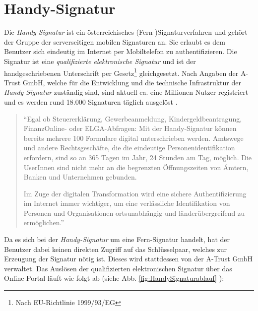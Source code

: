 \documentclass[11pt,a4paper,ngerman]{report}
\begin{document}
\section{Handy-Signatur}\label{sec:HandySignatur}
Die \textit{Handy-Signatur} ist ein österreichisches (Fern-)Signaturverfahren und gehört der Gruppe der serverseitigen mobilen Signaturen an. Sie erlaubt es dem Benutzer sich eindeutig im Internet per Mobiltelefon zu authentifizieren. Die Signatur ist eine \textit{qualifizierte elektronische Signatur} und ist der handgeschriebenen Unterschrift per Gesetz\footnote{Nach EU-Richtlinie 1999/93/EG\cite{eSigEU99}} gleichgesetzt. Nach Angaben der A-Trust GmbH, welche für die Entwicklung und die technische Infrastruktur der \textit{Handy-Signatur} zuständig sind, sind aktuell ca. eine Millionen Nutzer registriert und es werden rund 18.000 Signaturen täglich ausgelöst \cite{atrustHSig}.
\begin{quote}
    ``Egal ob Steuererklärung, Gewerbeanmeldung, Kindergeldbeantragung, FinanzOnline- oder ELGA-Abfragen: Mit der Handy-Signatur können bereits mehrere 100 Formulare digital unterschrieben werden. Amtswege und andere Rechtsgeschäfte, die die eindeutige Personenidentifikation erfordern, sind so an 365 Tagen im Jahr, 24 Stunden am Tag, möglich. Die UserInnen sind nicht mehr an die begrenzten Öffnungszeiten von Ämtern, Banken und Unternehmen gebunden.

    Im Zuge der digitalen Transformation wird eine sichere Authentifizierung im Internet immer wichtiger, um eine verlässliche Identifikation von Personen und Organisationen ortsunabhängig und länderübergreifend zu ermöglichen.'' \cite{atrustHSig}
\end{quote}
Da es sich bei der \textit{Handy-Signatur} um eine Fern-Signatur handelt, hat der Benutzer dabei keinen direkten Zugriff auf das Schlüsselpaar, welches zur Erzeugung der Signatur nötig ist. Dieses wird stattdessen von der A-Trust GmbH verwaltet. Das Auslösen der qualifizierten elektronischen Signatur über das Online-Portal läuft wie folgt ab (siehe Abb. \ref{fig:HandySignaturablauf} \cite[S. 3, Abb. 1]{mobQes}):
\end{document}
